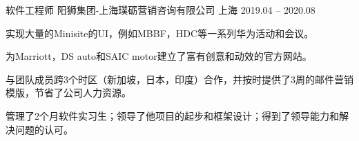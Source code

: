 \begin{cventries}
  \cventry
    {软件工程师} %
    {阳狮集团-上海璞砺营销咨询有限公司} %
    {上海} %
    {2019.04 -- 2020.08} %
    {
      \begin{cvitems} %
        \item{实现大量的Minisite的UI，例如MBBF，HDC等一系列华为活动和会议。}
        \item{为Marriott，DS auto和SAIC motor建立了富有创意和动效的官方网站。}
        \item{与团队成员跨3个时区（新加坡，日本，印度）合作，并按时提供了3周的邮件营销模版，节省了公司人力资源。}
        \item{管理了2个月软件实习生；领导了他项目的起步和框架设计；得到了领导能力和解决问题的认可。}
      \end{cvitems}
    }

\end{cventries}
